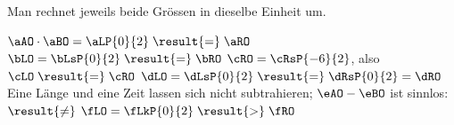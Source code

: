 Man rechnet jeweils beide Grössen in dieselbe Einheit um.
\begin{abcliste}
\abc $\aAO\cdot\aBO = \aLP{0}{2} \;\result{=}\; \aRO$
\abc $\bLO = \bLsP{0}{2} \;\result{=}\; \bRO$
\abc $\cRO = \cRsP{-6}{2}$, also $\cLO \;\result{=}\; \cRO$
\abc $\dLO = \dLsP{0}{2} \;\result{=}\; \dRsP{0}{2} = \dRO$
\abc Eine Länge und eine Zeit lassen sich nicht subtrahieren; $\eAO - \eBO$ ist sinnlos: $\result{\neq}$
\abc $\fLO = \fLkP{0}{2} \;\result{>}\; \fRO$
\end{abcliste}
